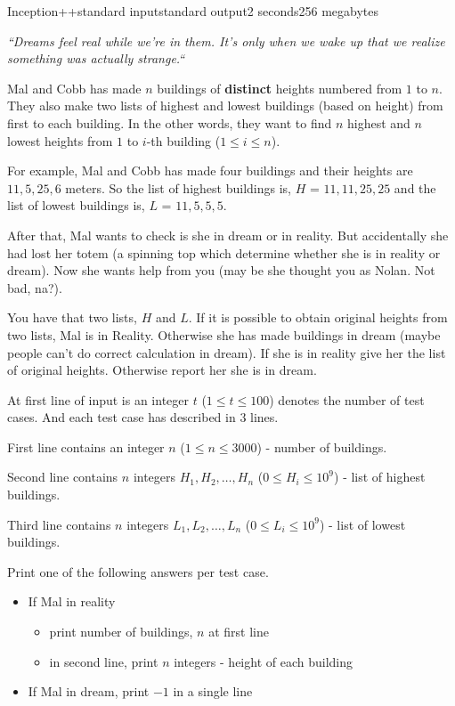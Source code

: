 \begin{problem}{Inception++}{standard input}{standard output}{2 seconds}{256 megabytes}

\textit{``Dreams feel real while we're in them. It's only when we wake up that we realize something was actually strange.``}

Mal and Cobb has made $n$ buildings of \textbf{distinct} heights numbered from $1$ to $n$. They also make two lists of highest and lowest buildings (based on height) from first to each building. In the other words, they want to find $n$ highest and $n$ lowest heights from $1$ to $i$-th building ($1 \le i \le n$).

For example, Mal and Cobb has made four buildings and their heights are ${11, 5, 25, 6}$ meters. So the list of highest buildings is, $H$ = ${11, 11, 25, 25}$ and the list of lowest buildings is, $L$ =  ${11, 5, 5, 5}$.

After that, Mal wants to check is she in dream or in reality. But accidentally she had lost her totem (a spinning top which determine whether she is in reality or dream). Now she wants help from you (may be she thought you as Nolan. Not bad, na?). 

You have that two lists, $H$ and $L$. If it is possible to obtain original heights from two lists, Mal is in Reality. Otherwise she has made buildings in dream (maybe people can't do correct calculation in dream). If she is in reality give her the list of original heights. Otherwise report her she is in dream.

\InputFile
At first line of input is an integer $t$ ($1 \le t \le 100$) denotes the number of test cases. And each test case has described in $3$ lines.

First line contains an integer $n$ ($1 \le n \le 3000$) - number of buildings.

Second line contains $n$ integers $H_1, H_2, \dots, H_n$ ($0 \le H_i \le 10^9$) - list of highest buildings.

Third line contains $n$ integers $L_1, L_2, \dots, L_n$ ($0 \le L_i \le 10^9$) - list of lowest buildings.

\OutputFile
Print one of the following answers per test case.
\begin{itemize}
\item If Mal in reality
\begin{itemize}
\item print number of buildings, $n$ at first line
\item in second line, print $n$ integers - height of each building
\end{itemize}
\item If Mal in dream, print $-1$ in a single line
\end{itemize}


\end{problem}
